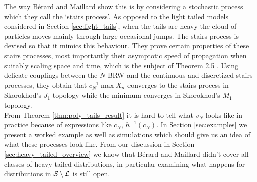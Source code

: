 The way Bérard and Maillard show this is by considering a stochastic process which they call the `stairs process'. As opposed to the light tailed models considered in Section \ref{sec:light_tails}, when the tails are heavy the cloud of particles moves mainly through large occasional jumps. The stairs process is devised so that it mimics this behaviour. They prove certain properties of these stairs processes, most importantly their asymptotic speed of propagation when suitably scaling space and time, which is the subject of Theorem 2.5 \cite{poly_tails}. Using delicate couplings between the $N$-BRW and the continuous and discretized stairs processes, they obtain that $c_N^{-1} \max X_n$ converges to the stairs process in Skorokhod's $J_1$ topology while the minimum converges in Skorokhod's $M_1$ topology. \\

From Theorem \ref{thm:poly_tails_result} it is hard to tell what $v_N$ looks like in practice because of expressions like $c_N$, $h^{-1}(c_N)$. In Section \ref{sec:examples} we present a worked example as well as simulations which should give us an idea of what these processes look like. From our discussion in Section \ref{sec:heavy_tailed_overview} we know that Bérard and Maillard didn't cover all classes of heavy-tailed distributions, in particular examining what happens for distributions in $\cal{S} \setminus \cal{L}$ is still open.





